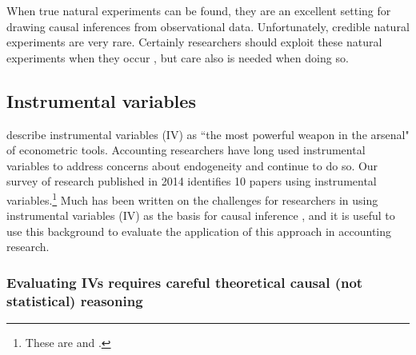 \documentclass[12pt,reqno,titlepage]{amsart}
\theoremstyle{definition}
\begin{document}
\begin{doublespace}

When true natural experiments can be found, they are an excellent setting for drawing causal inferences from observational data. 
Unfortunately, credible natural experiments are very rare.
Certainly researchers should exploit these natural experiments when they occur \citep[e.g.,][]{Michels:2015aa,Li:2015he}, but care also is needed when doing so.

\subsection{Instrumental variables}
\citet[p.114]{Angrist:2008vk} describe instrumental variables (IV) as ``the most powerful weapon in the arsenal" of econometric tools. 
Accounting researchers have long used instrumental variables to address concerns about endogeneity \citep{Larcker:2010fq,Lennox:2012it} and continue to do so.
Our survey of research published in 2014 identifies 10 papers using instrumental variables.\footnote{
These are \citet{Cannon:2014im,Cohen:2014jl,Kim:2014fm,Vermeer:2014bs,Fox:2014io,Guedhami:2013cj,Houston:2014hv,deFranco:2014ct,Erkens:2014hj} and \citet{Correia:2014fp}.}
Much has been written on the challenges for researchers in using instrumental variables (IV) as the basis for causal inference \citep[e.g.,][]{Roberts:2013cz}, and it is useful to use this background to evaluate the application of this approach in accounting research. 

\subsubsection{Evaluating IVs requires careful theoretical causal (not statistical) reasoning}


\end{doublespace}
\end{document}
